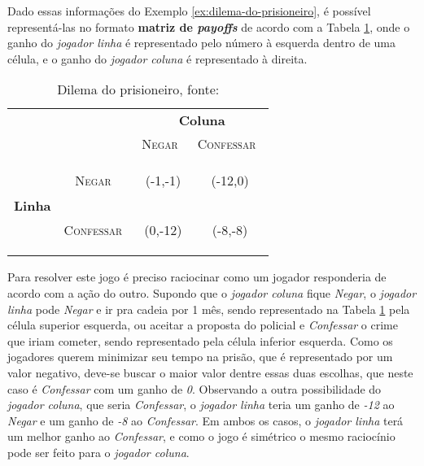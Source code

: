 Dado essas informações do Exemplo \ref{ex:dilema-do-prisioneiro}, é possível representá-las no formato {\bfseries matriz de \emph{payoffs}} de acordo com a Tabela \ref{tab:dilema-prisioneiro}, onde o ganho do \emph{jogador linha} é representado pelo número à esquerda dentro de uma célula, e o ganho do \emph{jogador coluna} é representado à direita.

\begin{table}[ht]
\centering
\begin{tabular}{|c|c|c|c|}
	\cline{3-4}
	\multicolumn{1}{c}{} &  & \multicolumn{2}{c|}{{\bfseries Coluna}}\tabularnewline
	\cline{3-4}
	\multicolumn{1}{c}{} &  & {\scshape Negar}\  & {\scshape Confessar}\ \tabularnewline
	\hline
	\multirow{2}{*}{\begin{turn}{90}
	{\bfseries Linha}
	\end{turn}} & \begin{turn}{90}
	{\scshape Negar}\
	\end{turn} & {\Large(}{\Large -1,}{\Large -1)} & {\Large(}{\Large -12,}{\Large 0)}\tabularnewline
	\cline{2-4}
	 & \begin{turn}{90}
	{\scshape Confessar}\
	\end{turn} & {\Large(}{\Large 0,}{\Large -12)} & {\Large(}{\Large -8,}{\Large -8)}\tabularnewline
	\hline
\end{tabular}
\caption{Dilema do prisioneiro, fonte: \cite{spaniel_2011}}
\label{tab:dilema-prisioneiro}
\end{table}

Para resolver este jogo é preciso raciocinar como um jogador responderia de acordo com a ação do outro. Supondo que o \emph{jogador coluna} fique \emph{Negar}, o \emph{jogador linha} pode \emph{Negar} e ir pra cadeia por 1 mês, sendo representado na Tabela \ref{tab:dilema-prisioneiro} pela célula superior esquerda, ou aceitar a proposta do policial e \emph{Confessar} o crime que iriam cometer, sendo representado pela célula inferior esquerda. Como os jogadores querem minimizar seu tempo na prisão, que é representado por um valor negativo, deve-se buscar o maior valor dentre essas duas escolhas, que neste caso é \emph{Confessar} com um ganho de \emph{0}. Observando a outra possibilidade do \emph{jogador coluna}, que seria \emph{Confessar}, o \emph{jogador linha} teria um ganho de \emph{-12} ao \emph{Negar} e um ganho de \emph{-8} ao \emph{Confessar}. Em ambos os casos, o \emph{jogador linha} terá um melhor ganho ao \emph{Confessar}, e como o jogo é simétrico o mesmo raciocínio pode ser feito para o \emph{jogador coluna}.


